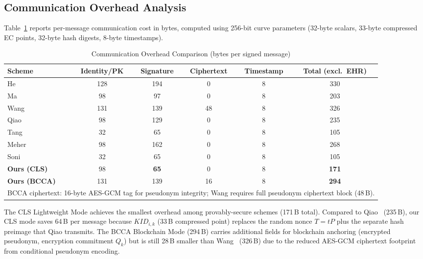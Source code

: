 \documentclass[conference]{IEEEtran}
\begin{document}
\subsection{Communication Overhead Analysis}

Table~\ref{tab:comm} reports per-message communication cost in bytes,
computed using 256-bit curve parameters (32-byte scalars, 33-byte
compressed EC points, 32-byte hash digests, 8-byte timestamps).

\begin{table}[htbp]
\centering
\caption{Communication Overhead Comparison (bytes per signed message)}
\label{tab:comm}
\renewcommand{\arraystretch}{1.2}
\setlength{\tabcolsep}{5pt}
\begin{tabular}{lccccc}
\toprule
\textbf{Scheme} & \textbf{Identity/PK} & \textbf{Signature} &
  \textbf{Ciphertext} & \textbf{Timestamp} & \textbf{Total (excl.\ EHR)} \\
\midrule
He~\cite{ref27}    & 128 & 194 & 0   & 8 & 330 \\
Ma~\cite{ref22}    &  98 &  97 & 0   & 8 & 203 \\
Wang~\cite{ref1}   & 131 & 139 & 48  & 8 & 326 \\
Qiao~\cite{ref24}  &  98 & 129 & 0   & 8 & 235 \\
Tang~\cite{ref25}  &  32 &  65 & 0   & 8 & 105 \\
Meher~\cite{ref28} &  98 & 162 & 0   & 8 & 268 \\
Soni~\cite{ref26}  &  32 &  65 & 0   & 8 & 105 \\
\midrule
\textbf{Ours (CLS)}  & 98 & \textbf{65} & 0  & 8 & \textbf{171} \\
\textbf{Ours (BCCA)} & 131 & 139 & 16  & 8 & \textbf{294} \\
\bottomrule
\multicolumn{6}{l}{\small BCCA ciphertext: 16-byte AES-GCM tag for pseudonym integrity; Wang requires full pseudonym ciphertext block (48\,B).}
\end{tabular}
\end{table}

The CLS Lightweight Mode achieves the smallest overhead among
provably-secure schemes (171\,B total). Compared to Qiao~\cite{ref24}
(235\,B), our CLS mode saves 64\,B per message because $KID_{i,k}$
(33\,B compressed point) replaces the random nonce $T = tP$ plus the
separate hash preimage that Qiao transmits. The BCCA Blockchain Mode
(294\,B) carries additional fields for blockchain anchoring
(encrypted pseudonym, encryption commitment $Q_k$) but is still
28\,B smaller than Wang~\cite{ref1} (326\,B) due to the reduced
AES-GCM ciphertext footprint from conditional pseudonym encoding.
\end{document}
